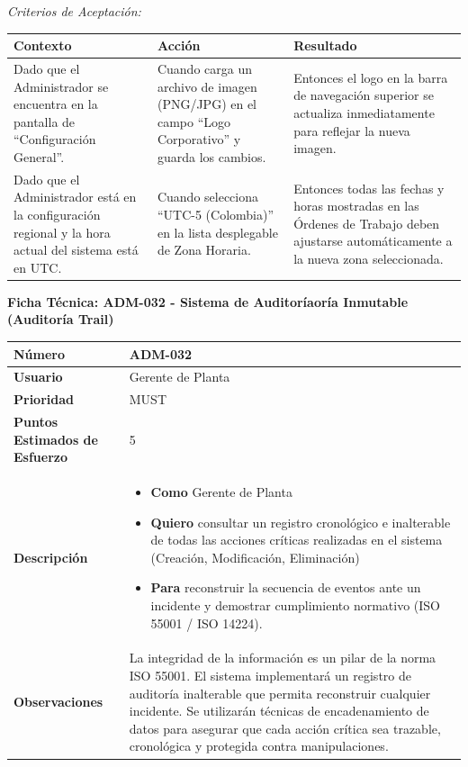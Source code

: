 \noindent\textit{Criterios de Aceptación:}
\footnotesize\begin{longtable}{|p{0.28\textwidth}|p{0.32\textwidth}|p{0.34\textwidth}|}\hline
\textbf{Contexto} & \textbf{Acción} & \textbf{Resultado} \\ \hline
\parbox[t]{\linewidth}{Dado que el Administrador se encuentra en la pantalla de ``Configuración General''.} & \parbox[t]{\linewidth}{Cuando carga un archivo de imagen (PNG/JPG) en el campo ``Logo Corporativo'' y guarda los cambios.} & \parbox[t]{\linewidth}{Entonces el logo en la barra de navegación superior se actualiza inmediatamente para reflejar la nueva imagen.} \\ \hline
\parbox[t]{\linewidth}{Dado que el Administrador está en la configuración regional y la hora actual del sistema está en UTC.} & \parbox[t]{\linewidth}{Cuando selecciona ``UTC-5 (Colombia)'' en la lista desplegable de Zona Horaria.} & \parbox[t]{\linewidth}{Entonces todas las fechas y horas mostradas en las Órdenes de Trabajo deben ajustarse automáticamente a la nueva zona seleccionada.} \\ \hline
\end{longtable}\normalsize
\vspace{1em}
\noindent\textbf{Ficha Técnica: ADM-032 - Sistema de Auditoríaoría Inmutable (Auditoría Trail)}
\footnotesize\setlength{\tabcolsep}{4pt}\renewcommand{\arraystretch}{1.2}
\begin{longtable}{|p{0.21\textwidth}|p{0.74\textwidth}|}\hline
\textbf{Número} & ADM-032 \\ \hline
\textbf{Usuario} & Gerente de Planta \\ \hline
\textbf{Prioridad} & MUST \\ \hline
\textbf{Puntos Estimados de Esfuerzo} & 5 \\ \hline
\textbf{Descripción} & \parbox[t]{\linewidth}{\vspace{2pt}\begin{itemize}[leftmargin=1.5em, nosep, topsep=0pt]
\item \textbf{Como} Gerente de Planta
\item \textbf{Quiero} consultar un registro cronológico e inalterable de todas las acciones críticas realizadas en el sistema (Creación, Modificación, Eliminación)
\item \textbf{Para} reconstruir la secuencia de eventos ante un incidente y demostrar cumplimiento normativo (ISO 55001 / ISO 14224).
\end{itemize}\vspace{2pt}} \\ \hline
\textbf{Observaciones} & La integridad de la información es un pilar de la norma ISO 55001. El sistema implementará un registro de auditoría inalterable que permita reconstruir cualquier incidente. Se utilizarán técnicas de encadenamiento de datos para asegurar que cada acción crítica sea trazable, cronológica y protegida contra manipulaciones. \\ \hline
\end{longtable}\normalsize
